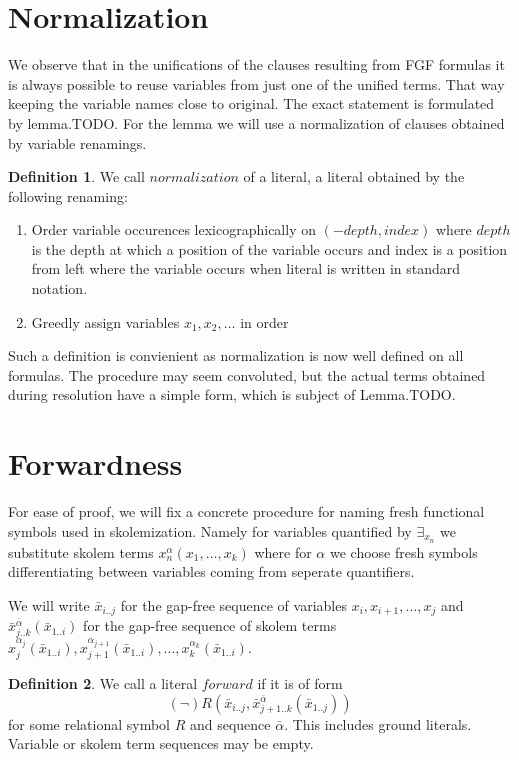 \documentclass[english, shortabstract]{iithesis}
\theoremstyle{definition} \newtheorem{definition}{Definition}[chapter]
\theoremstyle{remark} \newtheorem{remark}[definition]{Observation}
\theoremstyle{plain} \newtheorem{theorem}[definition]{Theorem}
\theoremstyle{plain} \newtheorem{lemma}[definition]{Lemma}
\begin{document}
\section{Normalization}
We observe that in the unifications of the clauses resulting from FGF formulas it is always possible to reuse variables from just one of the unified terms.
That way keeping the variable names close to original. The exact statement is formulated by lemma.TODO. 
For the lemma we will use a normalization of clauses obtained by variable renamings.

\begin{definition}
We call $normalization$ of a literal, a literal obtained by the following renaming:
\begin{enumerate}
    \item Order variable occurences lexicographically on $(-depth, index)$ 
    where $depth$ is the depth at which a position of the variable occurs and index is a position from left where the variable occurs when literal is written in standard notation.
    \item Greedly assign variables $x_1, x_2, \dots$ in order
\end{enumerate}
\end{definition}

Such a definition is convienient as normalization is now well defined on all formulas. 
The procedure may seem convoluted, but the actual terms obtained during resolution have a simple form, which is subject of Lemma.TODO.

\section{Forwardness}

For ease of proof, we will fix a concrete procedure for naming fresh functional symbols used in skolemization. 
Namely for variables quantified by $\exists_{x_n}$ we substitute skolem terms $x^\alpha_n(x_1, \dots, x_{k})$ where 
for $\alpha$ we choose fresh symbols differentiating between variables coming from seperate quantifiers.

We will write $\bar{x}_{i..j}$ for the gap-free sequence of variables $x_i, x_{i+1}, \dots, x_j$ and 
$\bar{x}^{\bar{\alpha}}_{j..k}(\bar{x}_{1..i})$ for the gap-free sequence of skolem terms $x^{\alpha_j}_{j}(\bar{x}_{1..i}), x^{\alpha_{j+1}}_{j+1}(\bar{x}_{1..i}), \dots, x^{\alpha_k}_k(\bar{x}_{1..i})$.

\begin{definition}
We call a literal $forward$ if it is of form
$$(\lnot)R(\bar{x}_{i..j}, \bar{x}^{\bar{\alpha}}_{{j+1..k}}(\bar{x}_{1..j}))$$
for some relational symbol $R$ and sequence $\bar{\alpha}$. This includes ground literals. Variable or skolem term sequences may be empty.
\end{definition}
\end{document}
